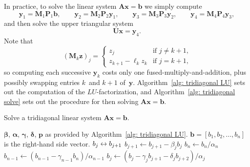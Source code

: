 In practice, to solve the linear system 
$\boldsymbol{A}\boldsymbol{x}=\boldsymbol{b}$ we simply compute
\[
\boldsymbol{y}_1=\boldsymbol{M}_1\boldsymbol{P}_1\boldsymbol{b},\qquad
\boldsymbol{y}_2=\boldsymbol{M}_2\boldsymbol{P}_2\boldsymbol{y}_1,\qquad
\boldsymbol{y}_3=\boldsymbol{M}_3\boldsymbol{P}_3\boldsymbol{y}_2,\qquad
\boldsymbol{y}_4=\boldsymbol{M}_4\boldsymbol{P}_4\boldsymbol{y}_3,
\]
and then solve the upper triangular system
\[
\boldsymbol{U}\boldsymbol{x}=\boldsymbol{y}_4.
\]
Note that 
\[
(\boldsymbol{M}_k\boldsymbol{z})_j=\begin{cases}
	z_j&\text{if $j\ne k+1$,}\\
	z_{k+1}-\ell_kz_k&\text{if $j=k+1$,}
\end{cases}
\]
so computing each successive $\boldsymbol{y}_k$ costs only one 
fused-multiply-and-addition, plus possibly swapping entries $k$~and $k+1$ 
of~$\boldsymbol{y}$.  Algorithm~\ref{alg: tridiagonal LU} sets out the 
computation of the $LU$-factorization, and 
Algorithm~\ref{alg: tridiagonal solve} sets out the procedure for then solving 
$\boldsymbol{A}\boldsymbol{x}=\boldsymbol{b}$.

\begin{algorithm}
\caption{Solve a tridiagonal linear system 
$\boldsymbol{A}\boldsymbol{x}=\boldsymbol{b}$.}
\label{alg: tridiagonal solve}
\begin{algorithmic}
\Require $\boldsymbol{\beta}$, $\boldsymbol{\alpha}$, $\boldsymbol{\gamma}$, 
$\boldsymbol{\delta}$, $\boldsymbol{p}$ as provided by 
Algorithm~\ref{alg: tridiagonal LU}.
\Require $\boldsymbol{b}=[b_1,b_2,\ldots,b_n]$ is the right-hand side vector.
\Statex
{}
		\State $b_j\leftrightarrow b_{j+1}$
	\EndIf
	\State $b_{j+1}\gets b_{j+1}-\beta_jb_j$
\EndFor
\State $b_n\gets b_n/\alpha_n$
\State $b_{n-1}\gets(b_{n-1}-\gamma_{n-1}b_n)/\alpha_{n-1}$
	\State $b_j\gets(b_j-\gamma_jb_{j+1}-\delta_jb_{j+2})/\alpha_j$
\EndFor
\EndFunction
\end{algorithmic}
\end{algorithm}